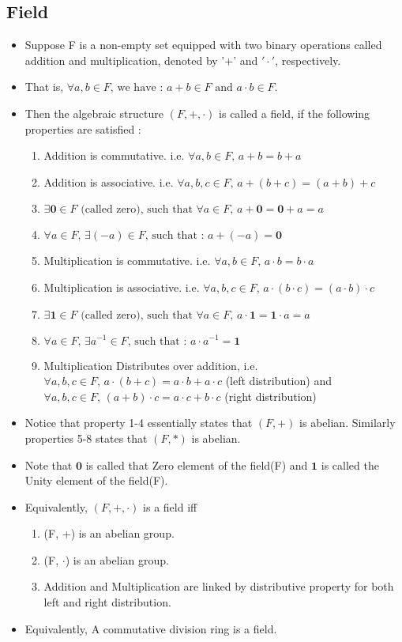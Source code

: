 \documentclass[twoside]{article}
\begin{document}
\subsection{Field}
\begin{itemize}
	\item Suppose F is a non-empty set equipped with two binary operations called addition and multiplication, denoted by '+' and $'\cdot'$, respectively. 
	\item That is, $\forall a,b \in F \text{, we have : } a + b \in F \text{ and } a \cdot b \in F $.
	\item Then the algebraic structure $(F, +, \cdot)$ is called a field, if the following properties are satisfied : 
		\begin{enumerate}
			\item Addition is commutative. i.e. $\forall a,b \in F \text{, } a + b = b + a$
			\item Addition is associative. i.e. $\forall a,b,c \in F \text{, } a + (b + c) = (a + b) + c$
			\item $\exists \mathbf{0}\in F \text{ (called zero), such that } \forall a \in F \text{, } a + \mathbf{0} = \mathbf{0} + a = a$
			\item $\forall a \in F \text{, } \exists (-a) \in F \text{, such that : } a + (-a) = \mathbf{0}$
			\item Multiplication is commutative. i.e. $\forall a,b \in F \text{, } a \cdot b = b \cdot a$
			\item Multiplication is associative. i.e. $\forall a,b,c \in F \text{, } a \cdot (b \cdot  c) = (a \cdot b) \cdot c$
			\item $\exists \mathbf{1}\in F \text{ (called zero), such that } \forall a \in F \text{, } a \cdot \mathbf{1} = \mathbf{1} \cdot a = a$
			\item $\forall a \in F \text{, } \exists a^{-1} \in F \text{, such that : } a \cdot a^{-1} = \mathbf{1}$
			\item Multiplication Distributes over addition, i.e. $\forall a,b,c \in F \text{, } a \cdot (b + c) = a \cdot b + a \cdot c $ (left distribution) and $\forall a,b,c \in F \text{, } (a + b) \cdot c = a \cdot c + b \cdot c$ (right distribution)
		\end{enumerate}
	\item Notice that property 1-4 essentially states that $(F,+)$ is abelian. Similarly properties 5-8 states that $(F,*)$ is abelian.
	\item Note that $\mathbf{0}$ is called that Zero element of the field(F) and $\mathbf{1}$ is called the Unity element of the field(F).
	\item Equivalently, $(F, +, \cdot)$ is a field iff
		\begin{enumerate}
			\item (F, +) is an abelian group.
			\item (F, $\cdot$) is an abelian group.
			\item Addition and Multiplication are linked by distributive property for both left and right distribution.
		\end{enumerate}
	\item Equivalently, A commutative division ring is a field.
\end{itemize}
\end{document}

